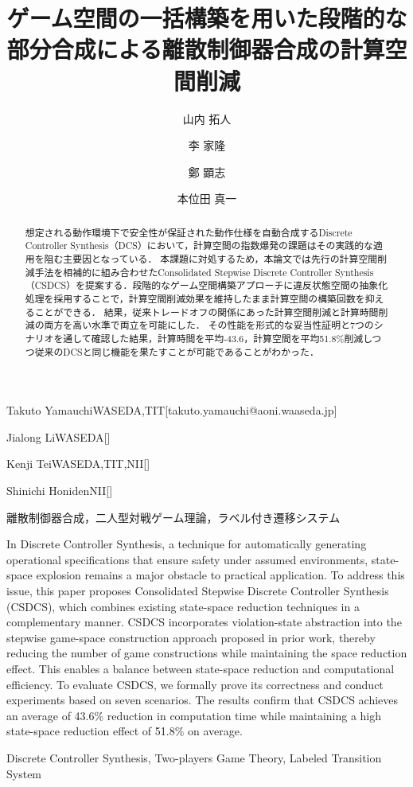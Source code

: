 \documentclass[submit]{ipsj}
\begin{document}
\title{ゲーム空間の一括構築を用いた段階的な部分合成による離散制御器合成の計算空間削減}



\author{山内 拓人}{Takuto Yamauchi}{WASEDA,TIT}[takuto.yamauchi@aoni.waaseda.jp]
\author{李 家隆}{Jialong Li}{WASEDA}[]
\author{鄭 顕志}{Kenji Tei}{WASEDA,TIT,NII}[]
\author{本位田 真一}{Shinichi Honiden}{NII}[]

\begin{abstract}
想定される動作環境下で安全性が保証された動作仕様を自動合成するDiscrete Controller Synthesis（DCS）において，計算空間の指数爆発の課題はその実践的な適用を阻む主要因となっている．
本課題に対処するため，本論文では先行の計算空間削減手法を相補的に組み合わせたConsolidated Stepwise Discrete Controller Synthesis（CSDCS）を提案する．段階的なゲーム空間構築アプローチに違反状態空間の抽象化処理を採用することで，計算空間削減効果を維持したまま計算空間の構築回数を抑えることができる．
結果，従来トレードオフの関係にあった計算空間削減と計算時間削減の両方を高い水準で両立を可能にした．
その性能を形式的な妥当性証明と7つのシナリオを通して確認した結果，計算時間を平均-43.6，計算空間を平均51.8\%削減しつつ従来のDCSと同じ機能を果たすことが可能であることがわかった．
\end{abstract}
\begin{jkeyword}
離散制御器合成，二人型対戦ゲーム理論，ラベル付き遷移システム
\end{jkeyword}


\begin{eabstract}
In Discrete Controller Synthesis, a technique for automatically generating operational specifications that ensure safety under assumed environments, state-space explosion remains a major obstacle to practical application.
To address this issue, this paper proposes Consolidated Stepwise Discrete Controller Synthesis (CSDCS), which combines existing state-space reduction techniques in a complementary manner.
CSDCS incorporates violation-state abstraction into the stepwise game-space construction approach proposed in prior work, thereby reducing the number of game constructions while maintaining the space reduction effect. This enables a balance between state-space reduction and computational efficiency.
To evaluate CSDCS, we formally prove its correctness and conduct experiments based on seven scenarios. The results confirm that CSDCS achieves an average of 43.6\% reduction in computation time while maintaining a high state-space reduction effect of 51.8\% on average.
\end{eabstract}
\begin{ekeyword}
Discrete Controller Synthesis, Two-players Game Theory, Labeled Transition System
\end{ekeyword}
\end{document}
